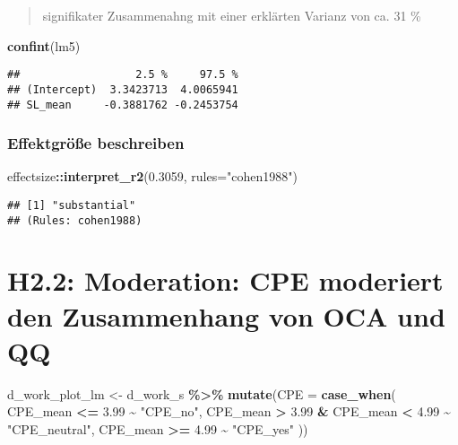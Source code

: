 \documentclass[
]{article}
\newenvironment{Shaded}{\begin{snugshade}}{\end{snugshade}}
\newcommand{\AttributeTok}[1]{\textcolor[rgb]{0.13,0.29,0.53}{#1}}
\newcommand{\FloatTok}[1]{\textcolor[rgb]{0.00,0.00,0.81}{#1}}
\newcommand{\FunctionTok}[1]{\textcolor[rgb]{0.13,0.29,0.53}{\textbf{#1}}}
\newcommand{\NormalTok}[1]{#1}
\newcommand{\OtherTok}[1]{\textcolor[rgb]{0.56,0.35,0.01}{#1}}
\newcommand{\SpecialCharTok}[1]{\textcolor[rgb]{0.81,0.36,0.00}{\textbf{#1}}}
\newcommand{\StringTok}[1]{\textcolor[rgb]{0.31,0.60,0.02}{#1}}
\begin{document}
\begin{quote}
signifikater Zusammenahng mit einer erklärten Varianz von ca. 31 \%
\end{quote}

\begin{Shaded}
\begin{Highlighting}[]
\FunctionTok{confint}\NormalTok{(lm5)}
\end{Highlighting}
\end{Shaded}

\begin{verbatim}
##                  2.5 %     97.5 %
## (Intercept)  3.3423713  4.0065941
## SL_mean     -0.3881762 -0.2453754
\end{verbatim}

\subsubsection{Effektgröße
beschreiben}\label{effektgruxf6uxdfe-beschreiben-4}

\begin{Shaded}
\begin{Highlighting}[]
\NormalTok{effectsize}\SpecialCharTok{::}\FunctionTok{interpret\_r2}\NormalTok{(}\FloatTok{0.3059}\NormalTok{, }\AttributeTok{rules=}\StringTok{"cohen1988"}\NormalTok{)}
\end{Highlighting}
\end{Shaded}

\begin{verbatim}
## [1] "substantial"
## (Rules: cohen1988)
\end{verbatim}

\section{H2.2: Moderation: CPE moderiert den Zusammenhang von OCA und
QQ}\label{h2.2-moderation-cpe-moderiert-den-zusammenhang-von-oca-und-qq}

\begin{Shaded}
\begin{Highlighting}[]
\NormalTok{d\_work\_plot\_lm }\OtherTok{\textless{}{-}}\NormalTok{ d\_work\_s }\SpecialCharTok{\%\textgreater{}\%} 
  \FunctionTok{mutate}\NormalTok{(}\AttributeTok{CPE =} \FunctionTok{case\_when}\NormalTok{(}
\NormalTok{    CPE\_mean }\SpecialCharTok{\textless{}=} \FloatTok{3.99} \SpecialCharTok{\textasciitilde{}} \StringTok{"CPE\_no"}\NormalTok{,}
\NormalTok{    CPE\_mean }\SpecialCharTok{\textgreater{}} \FloatTok{3.99} \SpecialCharTok{\&}\NormalTok{ CPE\_mean }\SpecialCharTok{\textless{}} \FloatTok{4.99} \SpecialCharTok{\textasciitilde{}} \StringTok{"CPE\_neutral"}\NormalTok{,}
\NormalTok{    CPE\_mean }\SpecialCharTok{\textgreater{}=} \FloatTok{4.99} \SpecialCharTok{\textasciitilde{}} \StringTok{"CPE\_yes"}
\NormalTok{  ))}
\end{Highlighting}
\end{Shaded}
\end{document}
